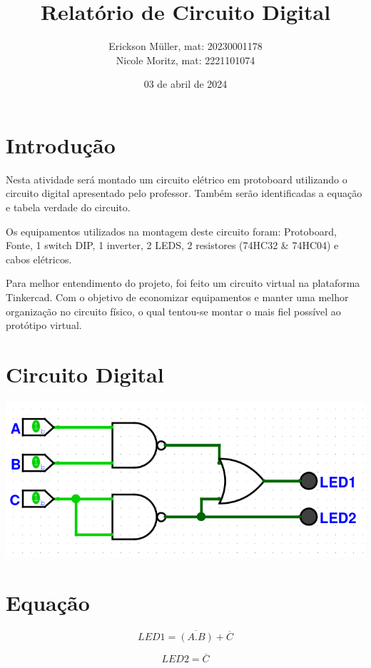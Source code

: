 \documentclass[]{article}
\title{Relatório de Circuito Digital}
\author{Erickson Müller, mat: 20230001178\\ Nicole Moritz, mat: 2221101074}
\date{03 de abril de 2024}
\begin{document}
\maketitle
\pagebreak
\section{Introdução}
	Nesta atividade será montado um circuito elétrico em protoboard utilizando o circuito digital apresentado pelo professor. Também serão identificadas a equação e tabela verdade do circuito.
	
	Os equipamentos utilizados na montagem deste circuito foram: Protoboard, Fonte, 1 switch DIP, 1 inverter, 2 LEDS, 2 resistores (74HC32 & 74HC04) e cabos elétricos.
	
	Para melhor entendimento do projeto, foi feito um circuito virtual na plataforma Tinkercad. Com o objetivo de economizar equipamentos e manter uma melhor organização no circuito físico, o qual tentou-se montar o mais fiel possível ao protótipo virtual.
	
\section{Circuito Digital}
	\includegraphics[scale=0.5]{images/circuito digital.png}
\section{Equação}
	\begin{equation}
		LED1 = \overline{(A.B)} + \overline{C} \label{eq:LED1.eq}
	\end{equation}
	
	\begin{equation}
		LED2 = \overline{C} \label{eq:LED2.eq}
	\end{equation}
	
\end{document}
